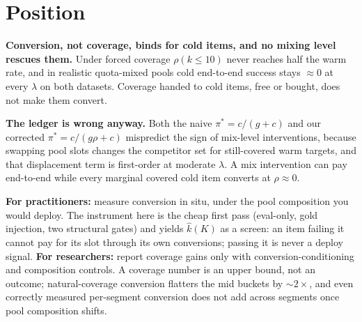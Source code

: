 \documentclass[sigconf,anonymous,review]{acmart}
\begin{document}
\section{Position}
\textbf{Conversion, not coverage, binds for cold items, and no mixing level rescues them.} Under forced coverage $\rho(k\le 10)$ never reaches half the warm rate, and in realistic quota-mixed pools cold end-to-end success stays $\approx 0$ at every $\lambda$ on both datasets. Coverage handed to cold items, free or bought, does not make them convert.

\textbf{The ledger is wrong anyway.} Both the naive $\pi^*=c/(g+c)$ and our corrected $\pi^*=c/(g\rho+c)$ mispredict the sign of mix-level interventions, because swapping pool slots changes the competitor set for still-covered warm targets, and that displacement term is first-order at moderate $\lambda$. A mix intervention can pay end-to-end while every marginal covered cold item converts at $\rho\approx 0$.

\textbf{For practitioners:} measure conversion in situ, under the pool composition you would deploy. The instrument here is the cheap first pass (eval-only, gold injection, two structural gates) and yields $\hat k(K)$ as a screen: an item failing it cannot pay for its slot through its own conversions; passing it is never a deploy signal. \textbf{For researchers:} report coverage gains only with conversion-conditioning and composition controls. A coverage number is an upper bound, not an outcome; natural-coverage conversion flatters the mid buckets by $\sim 2\times$, and even correctly measured per-segment conversion does not add across segments once pool composition shifts.

\begin{acks}
\end{acks}



\end{document}
